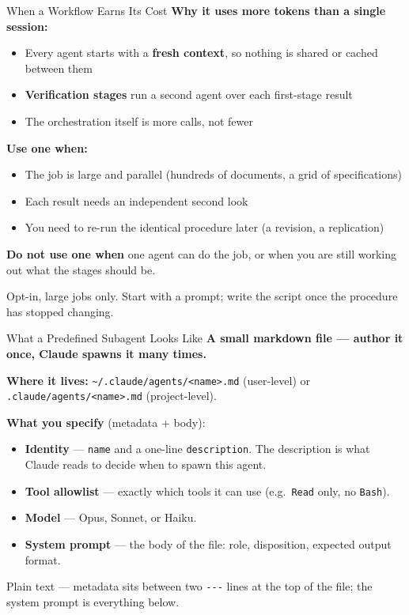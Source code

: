 \documentclass[aspectratio=169, 11pt]{beamer}
\begin{document}
\begin{frame}{When a Workflow Earns Its Cost}
  \textbf{Why it uses more tokens than a single session:}
  \begin{itemize}\small
    \item Every agent starts with a \textbf{fresh context}, so nothing is shared or cached between them
    \item \textbf{Verification stages} run a second agent over each first-stage result
    \item The orchestration itself is more calls, not fewer
  \end{itemize}

  \vspace{0.4em}
  \textbf{Use one when:}
  \begin{itemize}\small
    \item The job is large and parallel (hundreds of documents, a grid of specifications)
    \item Each result needs an independent second look
    \item You need to re-run the identical procedure later (a revision, a replication)
  \end{itemize}

  \vspace{0.4em}
  \textbf{Do not use one when} one agent can do the job, or when you are still working out what the stages should be.

  \vspace{0.4em}
  \alert{\small Opt-in, large jobs only. Start with a prompt; write the script once the procedure has stopped changing.}
\end{frame}

\begin{frame}{What a Predefined Subagent Looks Like}
  \textbf{A small markdown file --- author it once, Claude spawns it many times.}

  \vspace{0.4em}
  \textbf{Where it lives:} \texttt{\textasciitilde/.claude/agents/<name>.md} (user-level) or \texttt{.claude/agents/<name>.md} (project-level).

  \vspace{0.5em}
  \textbf{What you specify} (metadata + body):
  \begin{itemize}
    \item \textbf{Identity} --- \texttt{name} and a one-line \texttt{description}. The description is what Claude reads to decide when to spawn this agent.
    \item \textbf{Tool allowlist} --- exactly which tools it can use (e.g.\ \texttt{Read} only, no \texttt{Bash}).
    \item \textbf{Model} --- Opus, Sonnet, or Haiku.
    \item \textbf{System prompt} --- the body of the file: role, disposition, expected output format.
  \end{itemize}

  \vspace{0.3em}
  \alert{\small Plain text --- metadata sits between two \texttt{-{}-{}-} lines at the top of the file; the system prompt is everything below.}
\end{frame}
\end{document}
